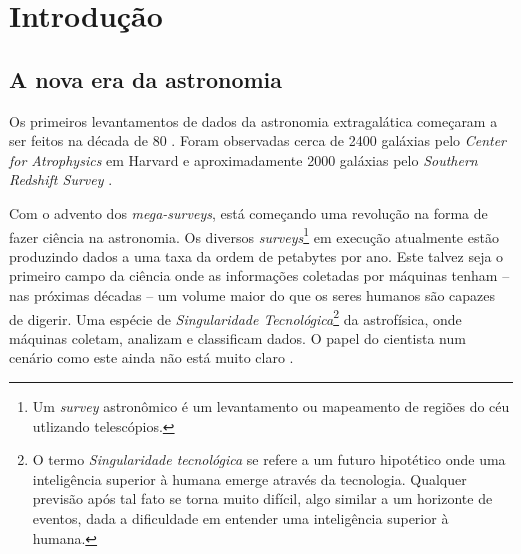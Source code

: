 


\chapter{Introdução}
\label{sec:Intro}


\section{A nova era da astronomia}
\label{sec:Intro:NovaEra}

Os primeiros levantamentos de dados da astronomia extragalática começaram a ser
feitos na década de 80 \citep{Huchra1988, Jones2005}. Foram observadas cerca de
2400 galáxias pelo {\em Center for Atrophysics} em Harvard \citep{Huchra1983} e
aproximadamente 2000 galáxias pelo {\em Southern Redshift Survey}
\citep{DaCosta1988}.

Com o advento dos {\em mega-surveys}\fixme, está começando uma revolução na
forma de fazer ciência na astronomia. Os diversos {\em surveys}\footnote{Um {\em
survey} astronômico é um levantamento ou mapeamento de regiões do céu utlizando
telescópios.} em execução atualmente estão produzindo dados a uma taxa da ordem
de petabytes por ano. Este talvez seja o primeiro campo da ciência onde as
informações coletadas por máquinas tenham -- nas próximas décadas -- um volume
maior do que os seres humanos são capazes de digerir. Uma espécie de {\em
Singularidade Tecnológica}\footnote{O termo {\em Singularidade tecnológica} se
refere a um futuro hipotético onde uma inteligência superior à humana emerge
através da tecnologia. Qualquer previsão após tal fato se torna muito difícil,
algo similar a um horizonte de eventos, dada a dificuldade em entender uma
inteligência superior à humana.} da astrofísica, onde máquinas coletam, analizam
e classificam dados. O papel do cientista num cenário como este ainda não está
muito claro \citep{Norris2010}.

